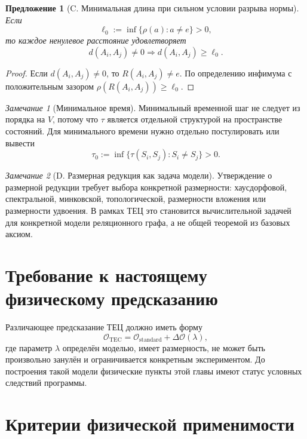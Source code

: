 \documentclass[12pt,a4paper,oneside]{book}
\theoremstyle{definition}
\theoremstyle{plain}
\newtheorem{proposition}{Предложение}[chapter]
\theoremstyle{remark}
\newtheorem{remark}{Замечание}[chapter]
\newcommand{\Rel}{R}
\newcommand{\Values}{V}
\newcommand{\State}{S}
\newcommand{\norm}{\rho}
\newcommand{\ide}{e}
\begin{document}
\begin{proposition}[C. Минимальная длина при сильном условии разрыва нормы]
Если
\[
\ell_0:=\inf\{\norm(a):a\neq\ide\}>0,
\]
то каждое ненулевое расстояние удовлетворяет
\[
d(A_i,A_j)\neq0\Longrightarrow d(A_i,A_j)\ge\ell_0.
\]
\end{proposition}

\begin{proof}
Если $d(A_i,A_j)\neq0$, то $\Rel(A_i,A_j)\neq\ide$. По определению инфимума с
положительным зазором $\norm(\Rel(A_i,A_j))\ge\ell_0$.
\end{proof}

\begin{remark}[Минимальное время]
Минимальный временной шаг не следует из порядка на $\Values$, потому что $\tau$
является отдельной структурой на пространстве состояний. Для минимального времени
нужно отдельно постулировать или вывести
\[
\tau_0:=\inf\{\tau(\State_i,\State_j):\State_i\neq\State_j\}>0.
\]
\end{remark}

\begin{remark}[D. Размерная редукция как задача модели]
Утверждение о размерной редукции требует выбора конкретной размерности:
хаусдорфовой, спектральной, минковской, топологической, размерности вложения или
размерности удвоения. В рамках ТЕЦ это становится вычислительной задачей для
конкретной модели реляционного графа, а не общей теоремой из базовых аксиом.
\end{remark}

\section{Требование к настоящему физическому предсказанию}

Различающее предсказание ТЕЦ должно иметь форму
\[
\mathcal O_{\mathrm{TEC}}
=
\mathcal O_{\mathrm{standard}}
+
\Delta\mathcal O(\lambda),
\]
где параметр $\lambda$ определён моделью, имеет размерность, не может быть
произвольно занулён и ограничивается конкретным экспериментом. До построения такой
модели физические пункты этой главы имеют статус условных следствий программы.

\section{Критерии физической применимости}
\end{document}
